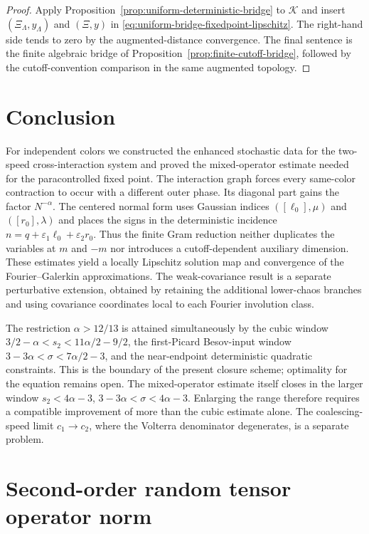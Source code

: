 \documentclass[10pt]{amsart}
\numberwithin{equation}{section}
\theoremstyle{plain}
\theoremstyle{definition}
\theoremstyle{remark}
\begin{document}
\begin{proof}
Apply Proposition~\ref{prop:uniform-deterministic-bridge} to $\mathcal K$ and insert $(\Xi_\Lambda,y_\Lambda)$ and $(\Xi,y)$ in \eqref{eq:uniform-bridge-fixedpoint-lipschitz}.  The right-hand side tends to zero by the augmented-distance convergence.  The final sentence is the finite algebraic bridge of Proposition~\ref{prop:finite-cutoff-bridge}, followed by the cutoff-convention comparison in the same augmented topology.
\end{proof}


\section{Conclusion}\label{sec:conclusion}
For independent colors we constructed the enhanced stochastic data for the two-speed cross-interaction system and proved the mixed-operator estimate needed for the paracontrolled fixed point.  The interaction graph forces every same-color contraction to occur with a different outer phase.  Its diagonal part gains the factor $N^{-\alpha}$.  The centered normal form uses Gaussian indices $([\ell_0],\mu)$ and $([r_0],\lambda)$ and places the signs in the deterministic incidence $n=q+\varepsilon_1\ell_0+\varepsilon_2r_0$.  Thus the finite Gram reduction neither duplicates the variables at $m$ and $-m$ nor introduces a cutoff-dependent auxiliary dimension.  These estimates yield a locally Lipschitz solution map and convergence of the Fourier--Galerkin approximations.  The weak-covariance result is a separate perturbative extension, obtained by retaining the additional lower-chaos branches and using covariance coordinates local to each Fourier involution class.

The restriction $\alpha>12/13$ is attained simultaneously by the cubic window $3/2-\alpha<s_2<11\alpha/2-9/2$, the first-Picard Besov-input window $3-3\alpha<\sigma<7\alpha/2-3$, and the near-endpoint deterministic quadratic constraints.  This is the boundary of the present closure scheme; optimality for the equation remains open.  The mixed-operator estimate itself closes in the larger window $s_2<4\alpha-3$, $3-3\alpha<\sigma<4\alpha-3$.  Enlarging the range therefore requires a compatible improvement of more than the cubic estimate alone.  The coalescing-speed limit $c_1\to c_2$, where the Volterra denominator degenerates, is a separate problem.

\appendix

\section{Second-order random tensor operator norm}\label{app:second-order-tensor-proof}
\end{document}
